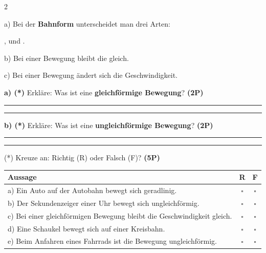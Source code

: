 \documentclass[11pt,a4paper]{article}
\begin{document}
\begin{multicols}{2}
\begin{tcolorbox}[title={2: Lückentext Grundbegriffe}]
\small
\vspace{2mm}
a) Bei der \textbf{Bahnform} unterscheidet man drei Arten: 

\underline{\hspace{2.5cm}}, \underline{\hspace{2.5cm}} und \underline{\hspace{2.5cm}}.

\vspace{3mm}
b) Bei einer \underline{\hspace{2.8cm}} Bewegung bleibt die \underline{\hspace{2.8cm}} gleich.

\vspace{3mm}
c) Bei einer \underline{\hspace{2.8cm}} Bewegung ändert sich die Geschwindigkeit.
\end{tcolorbox}

\begin{tcolorbox}[title={3: Erkläre die Begriffe}]
\small
\textbf{a) (*)} Erkläre: Was ist eine \textbf{gleichförmige Bewegung}? \textbf{(2P)}

\vspace{8mm}
\hrule
\vspace{6mm}
\hrule

\vspace{4mm}
\textbf{b) (*)} Erkläre: Was ist eine \textbf{ungleichförmige Bewegung}? \textbf{(2P)}

\vspace{8mm}
\hrule
\vspace{6mm}
\hrule
\end{tcolorbox}

\columnbreak

\begin{tcolorbox}[title={4: Richtig oder Falsch?}]
\small
(*) Kreuze an: Richtig (R) oder Falsch (F)? \textbf{(5P)}

\vspace{2mm}
\begin{tabular}{|p{6.2cm}|c|c|}
\hline
\textbf{Aussage} & \textbf{R} & \textbf{F} \\
\hline
a) Ein Auto auf der Autobahn bewegt sich geradlinig. & $\square$ & $\square$ \\
\hline
b) Der Sekundenzeiger einer Uhr bewegt sich ungleichförmig. & $\square$ & $\square$ \\
\hline
c) Bei einer gleichförmigen Bewegung bleibt die Geschwindigkeit gleich. & $\square$ & $\square$ \\
\hline
d) Eine Schaukel bewegt sich auf einer Kreisbahn. & $\square$ & $\square$ \\
\hline
e) Beim Anfahren eines Fahrrads ist die Bewegung ungleichförmig. & $\square$ & $\square$ \\
\hline
\end{tabular}
\end{tcolorbox}


\end{multicols}
\end{document}
